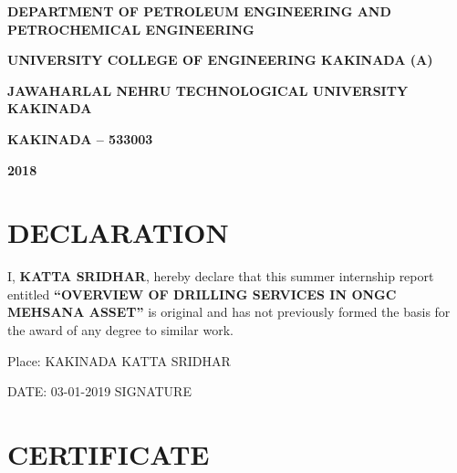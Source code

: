 \documentclass[11pt,a4paper]{report}
\begin{document}
\begin{titlepage}
\begin{center}
\vspace{1em}

\doublespacing

\large \textbf{DEPARTMENT OF PETROLEUM ENGINEERING AND \\
PETROCHEMICAL ENGINEERING}

\vspace{0.5em}

\large \textbf{UNIVERSITY COLLEGE OF ENGINEERING KAKINADA (A)}

\vspace{0.5em}

\large \textbf{JAWAHARLAL NEHRU TECHNOLOGICAL UNIVERSITY KAKINADA}

\vspace{0.5em}

\large \textbf{KAKINADA – 533003}

\vspace{0.5em}

\large \textbf{2018}

\end{center}
\end{titlepage}

\newpage

\section*{\centering DECLARATION}


\vspace{4em}

\doublespacing


I, \textbf{KATTA SRIDHAR}, hereby declare that this summer internship report entitled \textbf{“OVERVIEW OF DRILLING SERVICES IN ONGC MEHSANA ASSET”} is original and has not previously 
formed the basis for the award of any degree to similar work.


\vspace{5em}

\noindent Place: KAKINADA  \hfill KATTA SRIDHAR     \hspace{0.02\textwidth}

\vspace{1em}

\noindent DATE: 03-01-2019  \hfill SIGNATURE

\newpage
\section*{\centering CERTIFICATE}
\end{document}
